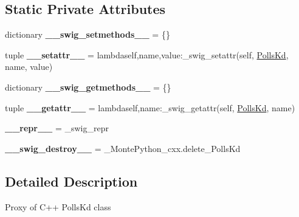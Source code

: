 \subsection*{Static Private Attributes}
\begin{DoxyCompactItemize}
\item 
\hypertarget{classMontePython__cxx_1_1PollsKd_adc12e867a09b9646b5b7e89dfe2a2521}{}dictionary {\bfseries \+\_\+\+\_\+swig\+\_\+setmethods\+\_\+\+\_\+} = \{\}\label{classMontePython__cxx_1_1PollsKd_adc12e867a09b9646b5b7e89dfe2a2521}

\item 
\hypertarget{classMontePython__cxx_1_1PollsKd_ac2c49fd8e7e0639cc7c3beb55bedfcab}{}tuple {\bfseries \+\_\+\+\_\+setattr\+\_\+\+\_\+} = lambdaself,name,value\+:\+\_\+swig\+\_\+setattr(self, \hyperlink{classMontePython__cxx_1_1PollsKd}{Polls\+Kd}, name, value)\label{classMontePython__cxx_1_1PollsKd_ac2c49fd8e7e0639cc7c3beb55bedfcab}

\item 
\hypertarget{classMontePython__cxx_1_1PollsKd_a4c8117a76ee0ebdb6aeb7f92d2350552}{}dictionary {\bfseries \+\_\+\+\_\+swig\+\_\+getmethods\+\_\+\+\_\+} = \{\}\label{classMontePython__cxx_1_1PollsKd_a4c8117a76ee0ebdb6aeb7f92d2350552}

\item 
\hypertarget{classMontePython__cxx_1_1PollsKd_a3144636090c0cd8dd7292a813b450b45}{}tuple {\bfseries \+\_\+\+\_\+getattr\+\_\+\+\_\+} = lambdaself,name\+:\+\_\+swig\+\_\+getattr(self, \hyperlink{classMontePython__cxx_1_1PollsKd}{Polls\+Kd}, name)\label{classMontePython__cxx_1_1PollsKd_a3144636090c0cd8dd7292a813b450b45}

\item 
\hypertarget{classMontePython__cxx_1_1PollsKd_a9c76c95c6c83ef03b6d9b212e3fdf198}{}{\bfseries \+\_\+\+\_\+repr\+\_\+\+\_\+} = \+\_\+swig\+\_\+repr\label{classMontePython__cxx_1_1PollsKd_a9c76c95c6c83ef03b6d9b212e3fdf198}

\item 
\hypertarget{classMontePython__cxx_1_1PollsKd_af1ec2299252a063df711830660777a19}{}{\bfseries \+\_\+\+\_\+swig\+\_\+destroy\+\_\+\+\_\+} = \+\_\+\+Monte\+Python\+\_\+cxx.\+delete\+\_\+\+Polls\+Kd\label{classMontePython__cxx_1_1PollsKd_af1ec2299252a063df711830660777a19}

\end{DoxyCompactItemize}


\subsection{Detailed Description}
\begin{DoxyVerb}Proxy of C++ PollsKd class\end{DoxyVerb}
 

